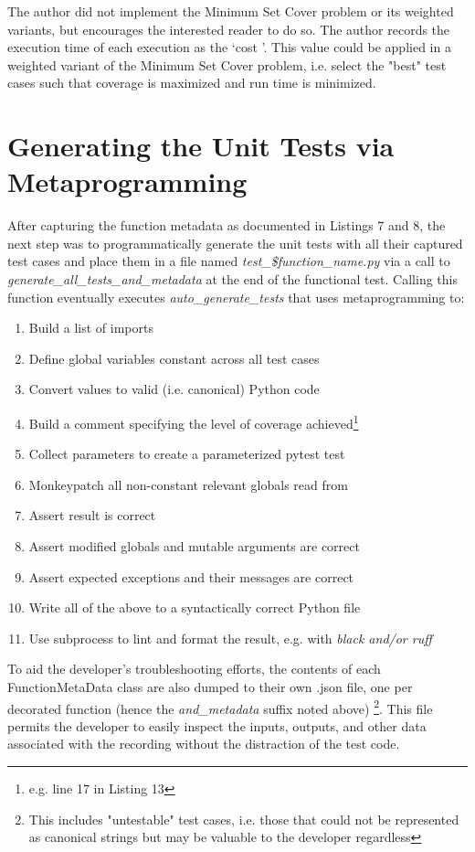 \documentclass[10pt, conference]{IEEEtran}
\begin{document}
The author did not implement 
the Minimum Set Cover problem or its weighted variants, but encourages 
the interested reader to do so.  The author records the execution time of each 
execution as the \lq cost \rq. This value could be applied in a weighted 
variant of the Minimum Set Cover problem, i.e. select the "best" test cases
such that coverage is maximized and run time is minimized.

\section{Generating the Unit Tests via Metaprogramming}\label{sec:generating-tests}

After capturing the function metadata as documented in Listings 7 and 8, 
the next step was to programmatically generate the unit tests with all their 
captured test cases and place them in a file named 
\textit{test\_\$function\_name.py}
via a call to \textit{generate\_all\_tests\_and\_metadata} at the end of 
the functional test.
Calling this function eventually executes \textit{auto\_generate\_tests} 
that uses metaprogramming to:
\begin{enumerate}
  \item Build a list of imports
  \item Define global variables constant across all test cases
  \item Convert values to valid (i.e. canonical) Python code
  \item Build a comment specifying the level of coverage achieved\footnote{e.g. line 17 in Listing 13}
  \item Collect parameters to create a parameterized pytest test
  \item Monkeypatch all non-constant relevant globals read from
  \item Assert result is correct
  \item Assert modified globals and mutable arguments are correct
  \item Assert expected exceptions and their messages are correct
  \item Write all of the above to a syntactically correct Python file
  \item Use subprocess to lint and format the result, e.g. with \textit{black and/or ruff}
\end{enumerate}

To aid the developer's troubleshooting efforts, the contents of each FunctionMetaData
class are also dumped to their own .json file, one per decorated function (hence
the \textit{and\_metadata} suffix noted above) \footnote{This includes 
"untestable" test cases, i.e. those that could not be represented as canonical strings
but may be valuable to the developer regardless}.  This file permits the 
developer to easily inspect the inputs, outputs, and other data
associated with the recording without the distraction of the test code.
\end{document}
